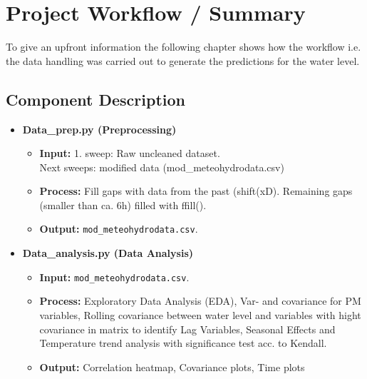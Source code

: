 \documentclass[a4paper,12pt]{article}
\begin{document}
\newpage
\section{Project Workflow / Summary}

To give an upfront information the following chapter shows how the workflow i.e. the data handling was carried out to generate the predictions for the water level.
\subsection*{Component Description}
\begin{itemize}
    \item \textbf{Data\_prep.py (Preprocessing)}
    \begin{itemize}
        \item \textbf{Input:} 1. sweep: Raw uncleaned dataset.\\ Next sweeps: modified data (mod\_meteohydrodata.csv)
        \item \textbf{Process:} Fill gaps with data from the past (shift(xD). Remaining gaps (smaller than ca. 6h) filled with ffill().
        \item \textbf{Output:} \texttt{mod\_meteohydrodata.csv}.
    \end{itemize}
    
    \item \textbf{Data\_analysis.py (Data Analysis)}
    \begin{itemize}
        \item \textbf{Input:} \texttt{mod\_meteohydrodata.csv}.
        \item \textbf{Process:} Exploratory Data Analysis (EDA), Var- and covariance for PM variables, Rolling covariance between water level and variables with hight covariance in matrix to identify Lag Variables, Seasonal Effects and Temperature trend analysis with significance test acc. to Kendall.
        \item \textbf{Output:} Correlation heatmap, Covariance plots, Time plots 
    \end{itemize}
    

\end{itemize}
\end{document}
